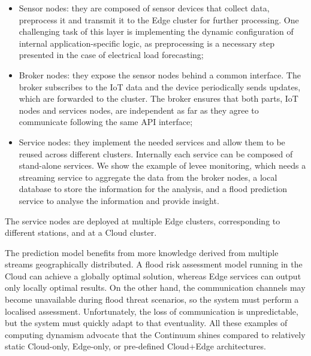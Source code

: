 \begin{itemize}
    \item Sensor nodes: they are composed of sensor devices that collect data, preprocess it and transmit it to the Edge cluster for further processing. One challenging task of this layer is implementing the dynamic configuration of internal application-specific logic, as preprocessing is a necessary step presented in the case of electrical load forecasting;
    \item Broker nodes: they expose the sensor nodes behind a common interface. The broker subscribes to the IoT data and the device periodically sends updates, which are forwarded to the cluster. The broker ensures that both parts, IoT nodes and services nodes, are independent as far as they agree to communicate following the same API interface;
    \item Service nodes: they implement the needed services and allow them to be reused across different clusters. Internally each service can be composed of stand-alone services. We show the example of levee monitoring, which needs a streaming service to aggregate the data from the broker nodes, a local database to store the information for the analysis, and a flood prediction service to analyse the information and provide insight. 
\end{itemize}

The service nodes are deployed at multiple Edge clusters, corresponding to different stations, and at a Cloud cluster.


The prediction model benefits from more knowledge derived from multiple streams geographically distributed. A flood risk assessment model running in the Cloud can achieve a globally optimal solution, whereas Edge services can output only locally optimal results. On the other hand, the communication channels may become unavailable during flood threat scenarios, so the system must perform a localised assessment. Unfortunately, the loss of communication is unpredictable, but the system must quickly adapt to that eventuality. All these examples of computing dynamism advocate that the Continuum shines compared to relatively static Cloud-only, Edge-only, or pre-defined Cloud+Edge architectures.

